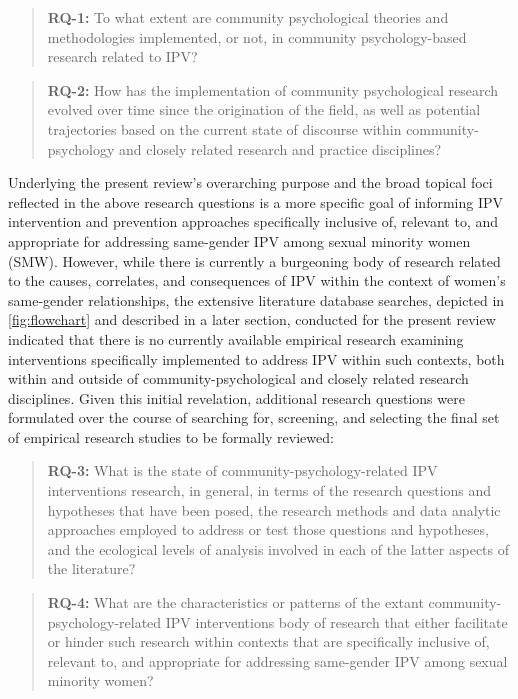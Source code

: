 \documentclass[11pt,]{tufte-book}
\newcommand{\rowgroup}[2][-1em]{\hspace{#1}#2}
\begin{document}
\begin{quote}
\rowgroup[-3em]{\textbf{RQ-1:} To what extent are community psychological theories and methodologies implemented, or not, in community psychology-based research related to IPV?}
\end{quote}

\begin{quote}
\rowgroup[-3em]{\textbf{RQ-2:} How has the implementation of community psychological research evolved over time since the origination of the field, as well as potential trajectories based on the current state of discourse within community-psychology and closely related research and practice disciplines?}
\end{quote}

Underlying the present review's overarching purpose and the broad
topical foci reflected in the above research questions is a more
specific goal of informing IPV intervention and prevention approaches
specifically inclusive of, relevant to, and appropriate for addressing
same-gender IPV among sexual minority women (SMW). However, while there
is currently a burgeoning body of research related to the causes,
correlates, and consequences of IPV within the context of women's
same-gender relationships, the extensive literature database searches,
depicted in \cref{fig:flowchart} and described in a
later section, conducted for the present review indicated that there is
no currently available empirical research examining interventions
specifically implemented to address IPV within such contexts, both
within and outside of community-psychological and closely related
research disciplines. Given this initial revelation, additional research
questions were formulated over the course of searching for, screening,
and selecting the final set of empirical research studies to be formally
reviewed:

\begin{quote}
\rowgroup[-3em]{\textbf{RQ-3:} What is the state of community-psychology-related IPV interventions research, in general, in terms of the research questions and hypotheses that have been posed, the research methods and data analytic approaches employed to address or test those questions and hypotheses, and the ecological levels of analysis involved in each of the latter aspects of the literature?}
\end{quote}

\begin{quote}
\rowgroup[-3em]{\textbf{RQ-4:} What are the characteristics or patterns of the extant community-psychology-related IPV interventions body of research that either facilitate or hinder such research within contexts that are specifically inclusive of, relevant to, and appropriate for addressing same-gender IPV among sexual minority women?}
\end{quote}
\end{document}
